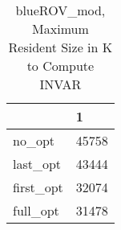 \begin{table}
\caption{blueROV\_mod, Maximum Resident Size in K to Compute INVAR}
\label{blueROV_mod_INVAR_size}
\begin{tabular}{ll}
\toprule
 & 1 \\
\midrule
no\_opt & 45758 \\
last\_opt & 43444 \\
first\_opt & 32074 \\
full\_opt & 31478 \\
\bottomrule
\end{tabular}
\end{table}
